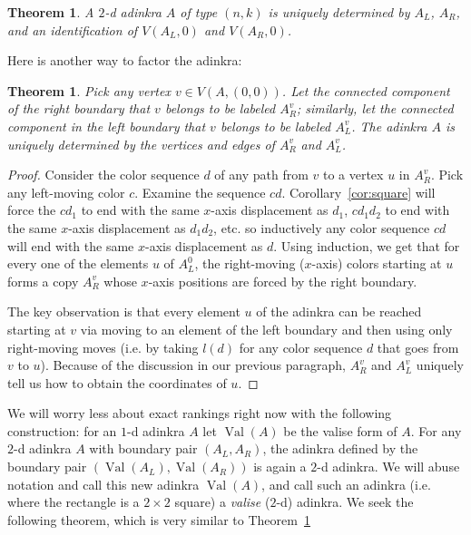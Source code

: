 \documentclass[12pt,twoside,singlespace]{article}
\numberwithin{equation}{section}
\newtheorem{thm}[equation]{Theorem}
\theoremstyle{definition}
\newcommand{\on}{\operatorname}
\newcommand{\val}{\on{Val}}
\begin{document}
\begin{thm}
\label{thm:boundary factorization}
A $2$-d adinkra $A$ of type $(n,k)$ is uniquely determined by $A_L$, $A_R$, and an identification of $V(A_L, 0)$ and $V(A_R, 0)$.
\end{thm}

Here is another way to factor the adinkra:

\begin{thm}
\label{thm:connected component factorization}
Pick any vertex $v \in V(A, (0,0))$. Let the connected component of the right boundary that $v$ belongs to be labeled $A_R^v$; similarly, let the connected component in the left boundary that $v$ belongs to be labeled $A_L^v$. The adinkra $A$ is uniquely determined by the vertices and edges of $A_R^v$ and $A_L^v$.
\end{thm}
\begin{proof}
Consider the color sequence $d$ of any path from $v$ to a vertex $u$ in $A_R^v$. Pick any left-moving color $c$. Examine the sequence $cd$. Corollary~\ref{cor:square} will force the $cd_1$ to end with the same $x$-axis displacement as $d_1$, $cd_1d_2$ to end with the same $x$-axis displacement as $d_1d_2$, etc. so inductively any color sequence $cd$ will end with the same $x$-axis displacement as $d$. Using induction, we get that for every one of the elements $u$ of $A_L^0$, the right-moving ($x$-axis) colors starting at $u$ forms a copy $A_R^v$ whose $x$-axis positions are forced by the right boundary. 

The key observation is that every element $u$ of the adinkra can be reached starting at $v$ via moving to an element of the left boundary and then using only right-moving moves (i.e. by taking $l(d)$ for any color sequence $d$ that goes from $v$ to $u$). Because of the discussion in our previous paragraph, $A_R^v$ and $A_L^v$ uniquely tell us how to obtain the coordinates of $u$.
\end{proof}

We will worry less about exact rankings right now with the following construction: for an $1$-d adinkra $A$ let $\val(A)$ be the valise form of $A$. For any $2$-d adinkra $A$ with boundary pair $(A_L, A_R)$, the adinkra defined by the boundary pair $(\val(A_L), \val(A_R))$ is again a $2$-d adinkra. We will abuse notation and call this new adinkra $\val(A)$, and call such an adinkra (i.e. where the rectangle is a $2 \times 2$ square) a \emph{valise} ($2$-d) adinkra. We seek the following theorem, which is very similar to Theorem~\ref{thm:boundary factorization}
\end{document}
